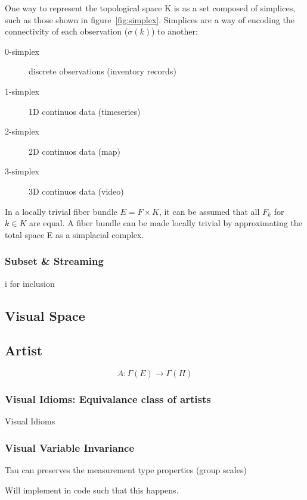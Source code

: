 \documentclass[../intro.tex]{subfiles}
\begin{document}
One way to represent the topological space K is as a set composed of simplices, such as those shown in figure~\ref{fig:simplex}. Simplices are a way of encoding the connectivity of each observation ($\sigma(k)$) to another:

\begin{description}
    \item[0-simplex] discrete observations (inventory records)
    \item[1-simplex] 1D continuos data (timeseries)
    \item[2-simplex] 2D continuos data (map)
    \item[3-simplex] 3D continuos data (video)
\end{description}

In a locally trivial fiber bundle $E = F \times K$, it can be assumed that all $F_{k}$ for $k \in K$ are equal. A fiber bundle can be made locally trivial by approximating the total space E as a simplacial complex.



\subsubsection{Subset \& Streaming}
i for inclusion 



\subsection{Visual Space}




\subsection{Artist}

\begin{equation}
    A: \Gamma(E) \rightarrow \Gamma(H)
\end{equation}

\subsubsection{Visual Idioms: Equivalance class of artists}
Visual Idioms

\subsubsection{Visual Variable Invariance}
Tau can preserves the measurement type properties (group scales)

Will implement in code such that this happens. 
\end{document}

